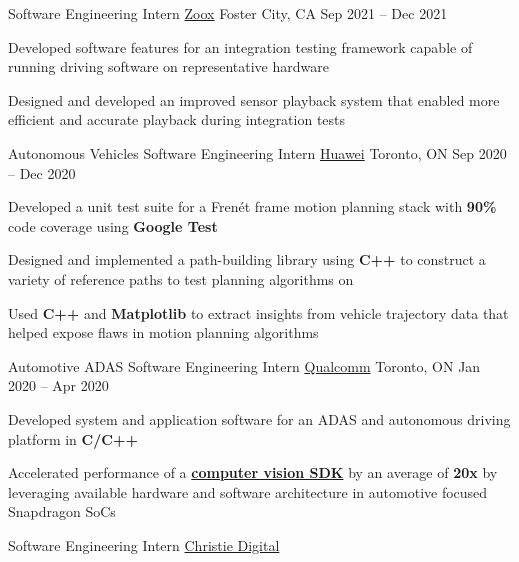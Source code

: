 \documentclass[]{awesome-cv}
\begin{document}
\vspace{-7mm}
\begin{cventries}
	\cventry
	{Software Engineering Intern}
	{\href{https://zoox.com/}{Zoox}}
	{Foster City, CA}
	{Sep 2021 – Dec 2021}
	{\begin{cvitems}
	    \item Developed software features for an integration testing framework capable of running driving software on representative hardware
	    \item Designed and developed an improved sensor playback system that enabled more efficient and accurate playback during integration tests
	\end{cvitems}}
	\cventry
	{Autonomous Vehicles Software Engineering Intern}
	{\href{https://www.huawei.com/ca/}{Huawei}}
	{Toronto, ON}
	{Sep 2020 – Dec 2020}
	{\begin{cvitems}
		\item {Developed a unit test suite for a Frenét frame motion planning stack with \textbf{90\%} code coverage using \textbf{Google Test}}
		\item {Designed and implemented a path-building library using \textbf{C++} to construct a variety of reference paths to test planning algorithms on}
		\item {Used \textbf{C++} and \textbf{Matplotlib} to extract insights from vehicle trajectory data that helped expose flaws in motion planning algorithms}
	\end{cvitems}}
	\cventry
	{Automotive ADAS Software Engineering Intern}
	{\href{https://www.qualcomm.com/}{Qualcomm}}
	{Toronto, ON}
	{Jan 2020 – Apr 2020}
	{\begin{cvitems}
		\item {Developed system and application software for an ADAS and autonomous driving platform in \textbf{C/C++}}
		\item {Accelerated performance of a \href{https://developer.qualcomm.com/software/fastcv-sdk}{\textbf{computer vision SDK}} by an average of \textbf{20x} by leveraging available hardware and software architecture in automotive focused Snapdragon SoCs}
		\end{cvitems}}
	\cventry
	{Software Engineering Intern}
	{\href{https://www.christiedigital.com/}{Christie Digital}}

\end{cventries}
\end{document}
